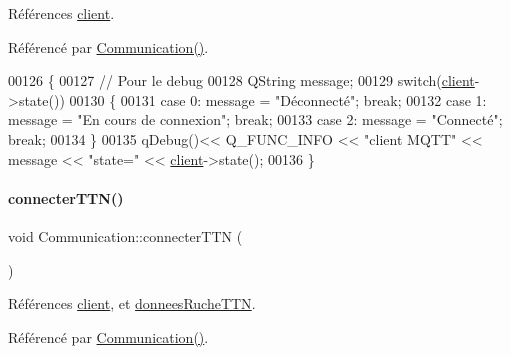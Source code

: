 Références \hyperlink{class_communication_a59ae01a54d6c3fde6242c46d802b954b}{client}.



Référencé par \hyperlink{class_communication_a7376830f5598b7e3c0eb4434a8a8766e}{Communication()}.


\begin{DoxyCode}
00126 \{
00127     \textcolor{comment}{// Pour le debug}
00128     QString message;
00129     \textcolor{keywordflow}{switch}(\hyperlink{class_communication_a59ae01a54d6c3fde6242c46d802b954b}{client}->state())
00130     \{
00131         \textcolor{keywordflow}{case} 0: message = \textcolor{stringliteral}{"Déconnecté"}; \textcolor{keywordflow}{break};
00132         \textcolor{keywordflow}{case} 1: message = \textcolor{stringliteral}{"En cours de connexion"}; \textcolor{keywordflow}{break};
00133         \textcolor{keywordflow}{case} 2: message = \textcolor{stringliteral}{"Connecté"}; \textcolor{keywordflow}{break};
00134     \}
00135     qDebug()<< Q\_FUNC\_INFO << \textcolor{stringliteral}{"client MQTT"} << message << \textcolor{stringliteral}{"state="} << \hyperlink{class_communication_a59ae01a54d6c3fde6242c46d802b954b}{client}->state();
00136 \}
\end{DoxyCode}
\mbox{\label{class_communication_aadec726c44e719fa587bd385533eb559}} 
\paragraph{\texorpdfstring{connecter\+T\+T\+N()}{connecterTTN()}}
{\footnotesize\ttfamily void Communication\+::connecter\+T\+TN (\begin{DoxyParamCaption}{ }\end{DoxyParamCaption})}



Références \hyperlink{class_communication_a59ae01a54d6c3fde6242c46d802b954b}{client}, et \hyperlink{class_communication_a5b7ff98c422c16085e7dc422f2ae51c5}{donnees\+Ruche\+T\+TN}.



Référencé par \hyperlink{class_communication_a7376830f5598b7e3c0eb4434a8a8766e}{Communication()}.


